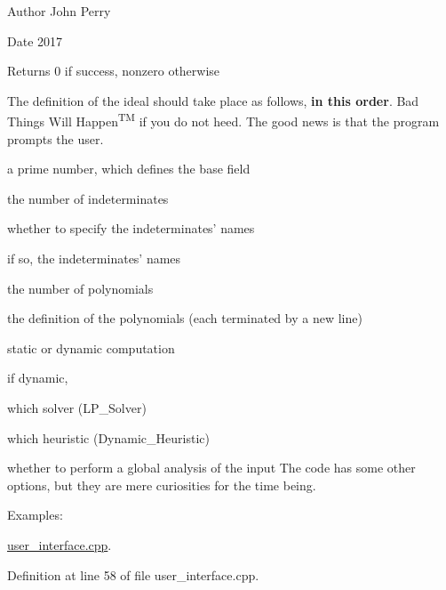 \begin{DoxyAuthor}{Author}
John Perry 
\end{DoxyAuthor}
\begin{DoxyDate}{Date}
2017 
\end{DoxyDate}
\begin{DoxyReturn}{Returns}
0 if success, nonzero otherwise
\end{DoxyReturn}
The definition of the ideal should take place as follows, {\bfseries in this order}. Bad Things Will Happen\textsuperscript{TM} if you do not heed. The good news is that the program prompts the user.
\begin{DoxyEnumerate}
\item a prime number, which defines the base field
\item the number of indeterminates
\item whether to specify the indeterminates' names
\item if so, the indeterminates' names
\item the number of polynomials
\item the definition of the polynomials (each terminated by a new line)
\item static or dynamic computation
\item if dynamic,
\begin{DoxyEnumerate}
\item which solver (L\+P\+\_\+\+Solver)
\item which heuristic (Dynamic\+\_\+\+Heuristic)
\item whether to perform a global analysis of the input The code has some other options, but they are mere curiosities for the time being. 
\end{DoxyEnumerate}
\end{DoxyEnumerate}\begin{Desc}
\item[Examples\+: ]\par
\hyperlink{user_interface_8cpp-example}{user\+\_\+interface.\+cpp}.\end{Desc}


Definition at line 58 of file user\+\_\+interface.\+cpp.

